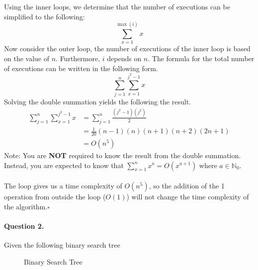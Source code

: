 \documentclass[12pt]{article}
\newcommand{\EOQ}{\hfill $\square$}
\begin{document}
Using the inner loops, we determine that the number of executions can be simplified to the following:
\begin{equation*}
\sum_{x=1}^{\max(i)}x
\end{equation*}
Now consider the outer loop, the number of executions of the inner loop is based on the value of $n$. Furthermore, $i$ depends on $n$. The formula for the total number of executions can be written in the following form.
\begin{equation*}
\sum_{j=1}^{n}\sum_{x=1}^{j^2-1}x
\end{equation*}
Solving the double summation yields the following the result.
\begin{equation*}
\begin{split}
\sum_{j=1}^{n}\sum_{x=1}^{j^2-1}x&=\sum_{j=1}^{n}\frac{(j^2-1)(j^2)}{2}\\&=\frac{1}{20}(n-1)(n)(n+1)(n+2)(2n+1)\\
&=O(n^5)
\end{split}
\end{equation*}
Note: You are \textbf{NOT} required to know the result from the double summation. Instead, you are expected to know that $\sum\limits_{x=1}^{n}x^a=O(x^{a+1})$ where $a\in\mathbb{N}_0$.\\\\The loop gives us a time complexity of $O(n^5)$, so the addition of the 1 operation from outside the loop ($O(1)$) will not change the time complexity of the algorithm.\EOQ
\paragraph{Question 2.} Given the following binary search tree

\begin{figure}[H]
		\centering
		\caption{Binary Search Tree}
		\label{fig:BST}
	\end{figure}
\end{document}
